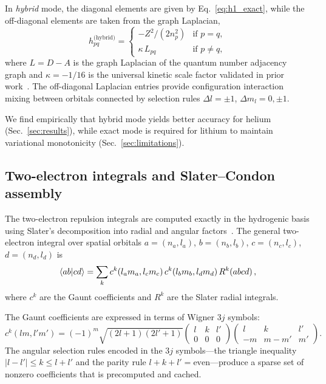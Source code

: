 \documentclass[aps,pra,twocolumn,superscriptaddress,longbibliography,floatfix]{revtex4-2}
\begin{document}
In \emph{hybrid} mode, the diagonal elements are given by
Eq.~\eqref{eq:h1_exact}, while the off-diagonal elements are
taken from the graph Laplacian,
\begin{equation}
h_{pq}^{\text{(hybrid)}} =
\begin{cases}
-Z^2/(2n_p^2) & \text{if } p = q, \\
\kappa \, L_{pq} & \text{if } p \neq q,
\end{cases}
\label{eq:h1_hybrid}
\end{equation}
where $L = D - A$ is the graph Laplacian of the quantum number
adjacency graph and $\kappa = -1/16$ is the universal kinetic
scale factor validated in prior work~\cite{Loutey2026a}.
The off-diagonal Laplacian entries provide configuration interaction
mixing between orbitals connected by selection rules
$\Delta l = \pm 1$, $\Delta m_l = 0, \pm 1$.

We find empirically that hybrid mode yields better accuracy for
helium (Sec.~\ref{sec:results}), while exact mode is required for
lithium to maintain variational monotonicity
(Sec.~\ref{sec:limitations}).

\subsection{Two-electron integrals and Slater--Condon assembly}
\label{sec:two_electron}

The two-electron repulsion integrals are computed exactly in the
hydrogenic basis using Slater's decomposition into radial and angular
factors~\cite{Slater1960,Condon1935}.
The general two-electron integral over spatial orbitals
$a = (n_a, l_a)$, $b = (n_b, l_b)$, $c = (n_c, l_c)$,
$d = (n_d, l_d)$ is
\begin{equation}
\braket{ab|cd} = \sum_k c^k(l_a m_a, l_c m_c)\,
c^k(l_b m_b, l_d m_d)\, R^k(abcd)\,,
\label{eq:eri}
\end{equation}
where $c^k$ are the Gaunt coefficients and $R^k$ are the Slater
radial integrals.

The Gaunt coefficients are expressed in terms of Wigner $3j$ symbols:
\begin{equation}
c^k(l m, l' m') = (-1)^m \sqrt{(2l+1)(2l'+1)}
\begin{pmatrix} l & k & l' \\ 0 & 0 & 0 \end{pmatrix}
\begin{pmatrix} l & k & l' \\ -m & m-m' & m' \end{pmatrix}.
\label{eq:gaunt}
\end{equation}
The angular selection rules encoded in the $3j$ symbols---the
triangle inequality $|l - l'| \leq k \leq l + l'$ and the parity
rule $l + k + l' = \text{even}$---produce a sparse set of nonzero
coefficients that is precomputed and cached.
\end{document}
